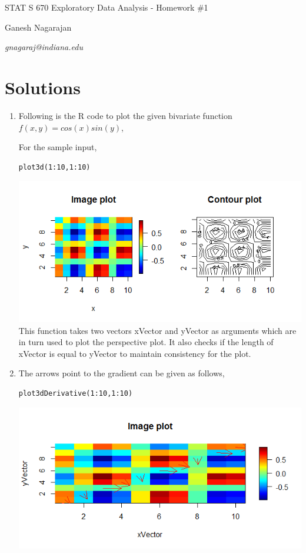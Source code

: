\documentclass{article}
\begin{document}
\lstset{language=R}
\centerline{\sc \large STAT S 670 Exploratory Data Analysis - Homework \#1}
\vspace{.5pc}
\centerline{\sc Ganesh Nagarajan}
\centerline{\it gnagaraj@indiana.edu}
\vspace{2pc}
\section{Solutions}
\begin{enumerate}
\item Following is the R code to plot the given bivariate function $f(x,y)=cos(x)sin(y)$,

For the sample input,
\begin{lstlisting}
plot3d(1:10,1:10)
\end{lstlisting}
\includegraphics[scale=0.5]{perspplot1}
\\This function takes two vectors xVector and yVector as arguments which are in turn used to plot the perspective plot. It also checks if the length of xVector is equal to yVector to maintain consistency for the plot.
\item The arrows point to the gradient can be given as follows,\\
\begin{lstlisting}
plot3dDerivative(1:10,1:10)
\end{lstlisting}
\includegraphics[scale=0.5]{derivplot}

\end{enumerate}
\end{document}
